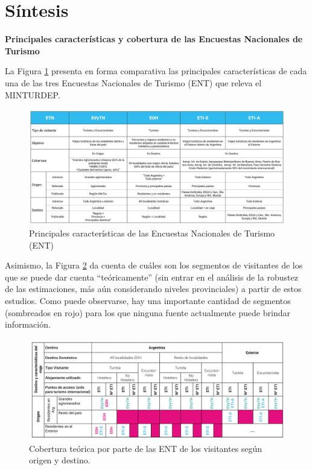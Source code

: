 \documentclass[
  openany]{book}
\begin{document}
\hypertarget{suxedntesis}{%
\section{Síntesis}\label{suxedntesis}}

\textbf{Principales características y cobertura de las Encuestas Nacionales de Turismo}

La Figura \ref{fig:ent} presenta en forma comparativa las principales características de cada una de las tres Encuestas Nacionales de Turismo (ENT) que releva el MINTURDEP.

\begin{figure}

{\centering \includegraphics[width=0.8\linewidth]{imagenes/figura2.3} 

}

\caption{Principales características de las Encuestas Nacionales de Turismo (ENT)}\label{fig:ent}
\end{figure}

Asimismo, la Figura \ref{fig:coberturaENT} da cuenta de cuáles son los segmentos de visitantes de los que se puede dar cuenta ``teóricamente'' (sin entrar en el análisis de la robustez de las estimaciones, más aún considerando niveles provinciales) a partir de estos estudios.
Como puede observarse, hay una importante cantidad de segmentos (sombreados en rojo) para los que ninguna fuente actualmente puede brindar información.

\begin{figure}

{\centering \includegraphics[width=0.8\linewidth]{imagenes/figura2.4} 

}

\caption{Cobertura teórica por parte de las ENT de los visitantes según origen y destino.}\label{fig:coberturaENT}
\end{figure}
\end{document}

